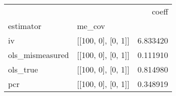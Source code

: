 \begin{tabular}{llr}
\toprule
    &                    &     coeff \\
estimator & me\_cov &           \\
\midrule
iv & [[100, 0], [0, 1]] &  6.833420 \\
ols\_mismeasured & [[100, 0], [0, 1]] &  0.111910 \\
ols\_true & [[100, 0], [0, 1]] &  0.814980 \\
pcr & [[100, 0], [0, 1]] &  0.348919 \\
\bottomrule
\end{tabular}
